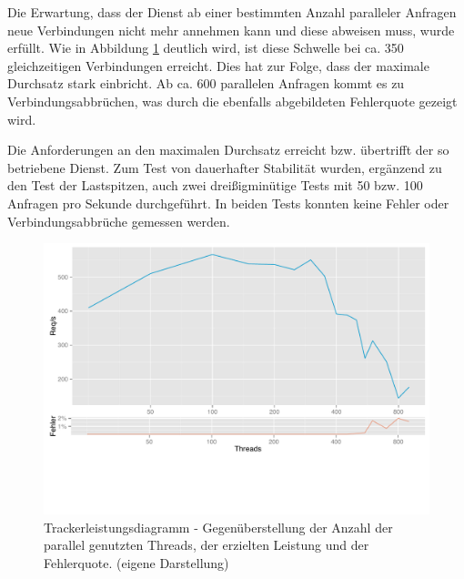Die Erwartung, dass der Dienst ab einer bestimmten Anzahl paralleler Anfragen neue Verbindungen nicht mehr annehmen kann und diese abweisen muss, wurde erfüllt. Wie in Abbildung \ref{fig:chart_tracker} deutlich wird, ist diese Schwelle bei ca. 350 gleichzeitigen Verbindungen erreicht. Dies hat zur Folge, dass der maximale Durchsatz stark einbricht. Ab ca. 600 parallelen Anfragen kommt es zu Verbindungsabbrüchen, was durch die ebenfalls abgebildeten Fehlerquote gezeigt wird.

Die Anforderungen an den maximalen Durchsatz erreicht bzw. übertrifft der so betriebene Dienst. Zum Test von dauerhafter Stabilität wurden, ergänzend zu den Test der Lastspitzen, auch zwei dreißigminütige Tests mit  50 bzw. 100 Anfragen pro Sekunde durchgeführt. In beiden Tests konnten keine Fehler oder Verbindungsabbrüche gemessen werden.

\begin{figure}[htb]
  \centering
    \includegraphics[width=\textwidth]{Abbildungen/tracker.pdf}
    \caption[Leistung Tracker]{Trackerleistungsdiagramm - Gegenüberstellung der Anzahl der parallel genutzten Threads, der erzielten Leistung und der Fehlerquote. { \scriptsize (eigene Darstellung)}}
    \label{fig:chart_tracker}
\end{figure}

